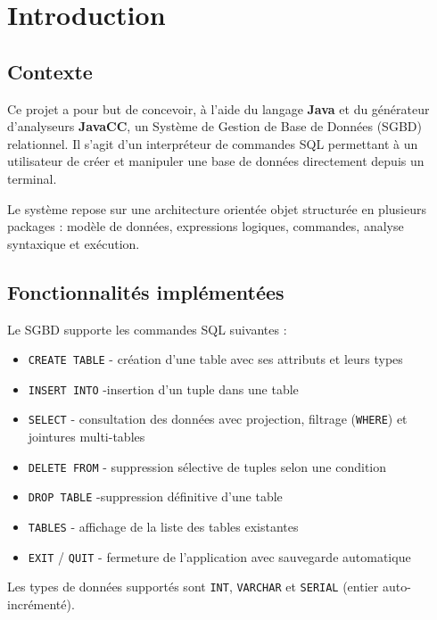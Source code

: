 \section{Introduction}

\subsection{Contexte}
Ce projet a pour but de concevoir, à l'aide du langage \textbf{Java} 
et du générateur d'analyseurs \textbf{JavaCC}, un Système de Gestion 
de Base de Données (SGBD) relationnel. Il s'agit d'un interpréteur 
de commandes SQL permettant à un utilisateur de créer et manipuler 
une base de données directement depuis un terminal.

Le système repose sur une architecture orientée objet structurée en 
plusieurs packages : modèle de données, expressions logiques, 
commandes, analyse syntaxique et exécution.

\subsection{Fonctionnalités implémentées}
Le SGBD supporte les commandes SQL suivantes :

\begin{itemize}
    \item \texttt{CREATE TABLE} - création d'une table avec ses attributs et leurs types
    \item \texttt{INSERT INTO} -insertion d'un tuple dans une table
    \item \texttt{SELECT} - consultation des données avec projection, 
          filtrage (\texttt{WHERE}) et jointures multi-tables
    \item \texttt{DELETE FROM} - suppression sélective de tuples selon une condition
    \item \texttt{DROP TABLE} -suppression définitive d'une table
    \item \texttt{TABLES} - affichage de la liste des tables existantes
    \item \texttt{EXIT} / \texttt{QUIT} - fermeture de l'application 
          avec sauvegarde automatique
\end{itemize}

Les types de données supportés sont \texttt{INT}, \texttt{VARCHAR} et \texttt{SERIAL} (entier auto-incrémenté).